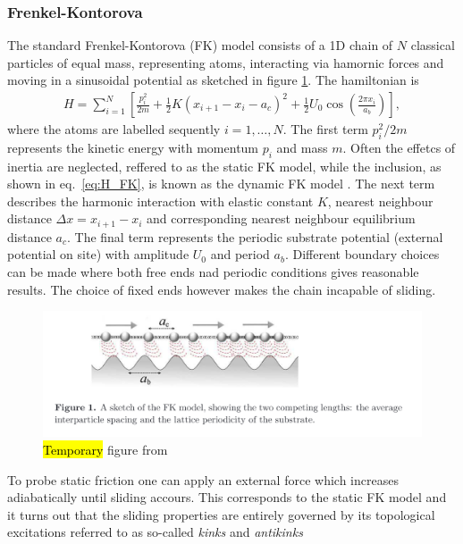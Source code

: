 
\subsubsection{Frenkel-Kontorova}

The standard Frenkel-Kontorova (FK) model consists of a 1D chain of $N$ classical
particles of equal mass, representing atoms, interacting via hamornic forces and moving in a sinusoidal potential as sketched in figure \ref{fig:FK_model}. The hamiltonian
is 
\begin{align}
  H = \sum_{i=1}^N \left[\frac{p_i^2}{2m} + \frac{1}{2}K(x_{i+1} - x_i - a_c)^2 + \frac{1}{2}U_0 \cos{\left(\frac{2\pi x_i}{a_b}\right)}\right],
  \label{eq:H_FK}
\end{align}
where the atoms are labelled sequently $i = 1, \hdots, N$. The first term $p_i^2/2m$ represents the kinetic energy with momentum $p_i$
and mass $m$. Often the effetcs of inertia are neglected, reffered to as the static FK model, while the inclusion, as shown in eq.~\eqref{eq:H_FK}, is known as the dynamic FK model \cite{FK2D}. The next term describes the harmonic interaction with elastic
constant $K$, nearest neighbour distance $\Delta x = x_{i+1} - x_i$ and 
corresponding nearest neighbour equilibrium distance $a_c$. The final term represents the periodic substrate potential (external potential on site) with amplitude $U_0$ and period $a_b$. Different boundary choices can be made where both free ends nad periodic conditions gives reasonable results. The choice of fixed ends however makes the chain incapable of sliding.


\begin{figure}[H]
  \centering
  \includegraphics[width=0.8\linewidth]{figures/theory/FK_model.png}
  \caption{\hl{Temporary} figure from \cite{Manini_2016}}
  \label{fig:FK_model}
\end{figure}

To probe static friction one can apply an external force which increases adiabatically until sliding accours. This corresponds to the static FK model and it turns out that the sliding properties are entirely governed by its topological excitations referred to as so-called \textit{kinks} and \textit{antikinks}

